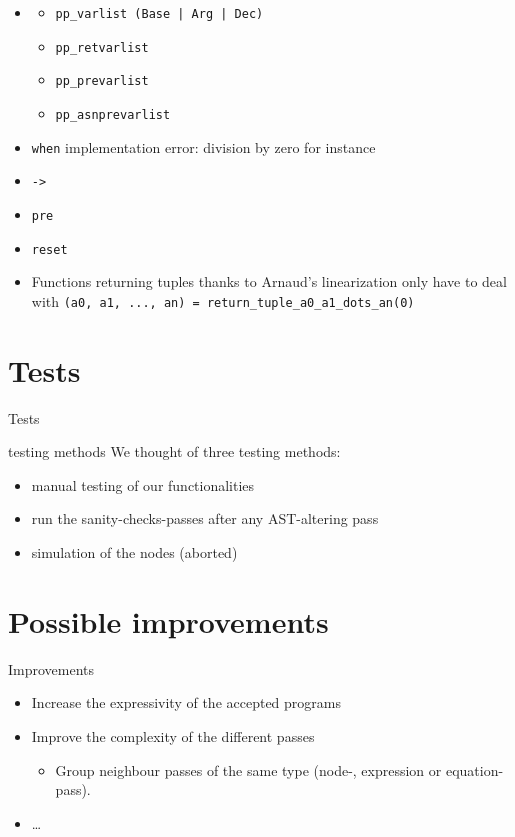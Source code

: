 \documentclass{beamer}
\begin{document}
\begin{frame}
	\begin{itemize}
		\item
			\begin{itemize}
				\item \texttt{pp\_varlist (Base | Arg | Dec)}
				\item \texttt{pp\_retvarlist}
				\item \texttt{pp\_prevarlist}
				\item \texttt{pp\_asnprevarlist}
			\end{itemize}
		\pause
		\item \texttt{when} implementation error: division by zero for instance
		\pause
		\item \texttt{->}
		\pause
		\item \texttt{pre}
		\pause
		\item \texttt{reset}
		\pause
		\item Functions returning tuples thanks to Arnaud's linearization only have to deal with \texttt{(a0, a1, ..., an) = return\_tuple\_a0\_a1\_dots\_an(0)}
	\end{itemize}
\end{frame}

\section{Tests}
\begin{frame}{Tests}
    \begin{block}{testing methods}
        We thought of three testing methods:
        \begin{itemize}
            \item manual testing of our functionalities
            \item run the sanity-checks-passes after any AST-altering pass
            \item simulation of the nodes (aborted)
        \end{itemize}
    \end{block}
\end{frame}

\section{Possible improvements}
\begin{frame}{Improvements}
    \begin{itemize}
        \item Increase the expressivity of the accepted programs
        \item Improve the complexity of the different passes
        \begin{itemize}
            \item Group neighbour passes of the same type (node-, expression or
            equation-pass).
        \end{itemize}
        \item \dots{}
    \end{itemize}
\end{frame}
\end{document}
